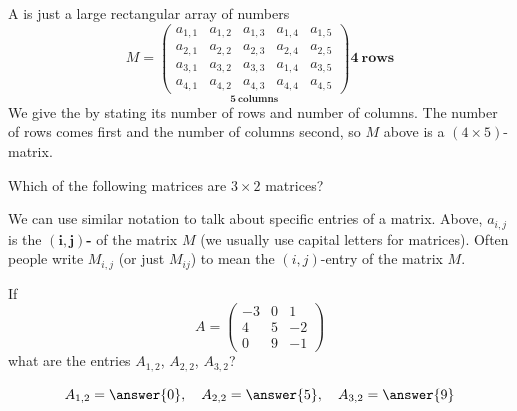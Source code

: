 \documentclass{ximera}
\begin{document}
A  is just a large rectangular array of numbers
\[
M =
\underset{\displaystyle\boldsymbol{5}~\textbf{columns}}{\begin{pmatrix}
  a_{1,1} & a_{1,2} & a_{1,3} & a_{1,4} & a_{1,5} \\
  a_{2,1} & a_{2,2} & a_{2,3} & a_{2,4} & a_{2,5} \\
  a_{3,1} & a_{3,2} & a_{3,3} & a_{1,4} & a_{3,5} \\
  a_{4,1} & a_{4,2} & a_{4,3} & a_{4,4} & a_{4,5}
\end{pmatrix}}
\boldsymbol{4}~\textbf {rows}
\]
We give the  by stating its number of rows
and number of columns. The number of rows comes first and the number
of columns second, so $M$ above is a $(4\times 5)$-matrix.
\begin{question}
  Which of the following matrices are $3\times 2$ matrices?
  \begin{selectAll}
  \pdfOnly{\end{multicols}}
  \end{selectAll}
\end{question}


We can use similar notation to talk about specific entries of a
matrix. Above, $a_{i,j}$ is the $\boldsymbol{(i,j)}${\bf-}
of the matrix $M$ (we usually use capital letters for matrices). Often
people write $M_{i,j}$ (or just $M_{ij}$) to mean the $(i,j)$-entry of
the matrix $M$.



\begin{question}
  If
  \[A= \begin{pmatrix}
  -3 & 0 & 1\\
  4 & 5 & -2\\
  0 & 9 & -1
  \end{pmatrix}
  \]
  what are the entries $A_{1,2}$, $A_{2,2}$, $A_{3,2}$?
  \begin{prompt}
    \[
    A_{1,2} = \answer{0}, \quad A_{2,2} = \answer{5}, \quad A_{3,2} = \answer{9}
    \]
  \end{prompt}
\end{question}
\end{document}
